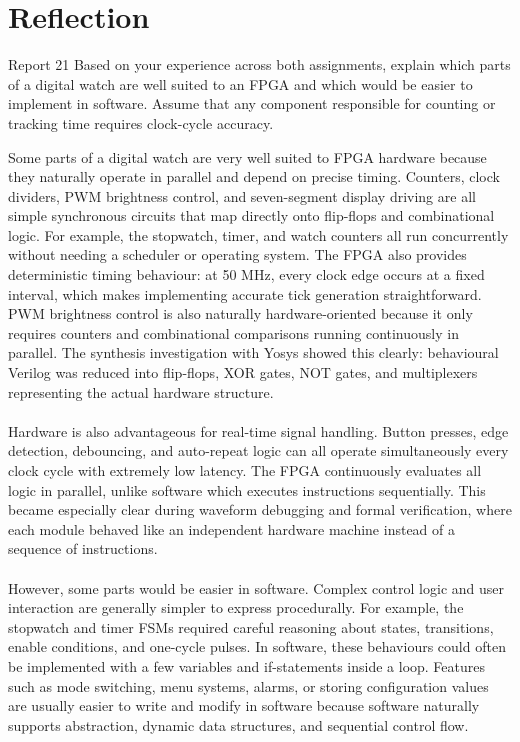 \documentclass[12pt]{article}
\begin{document}
\section{Reflection}
	\begin{reportbox}{Report 21}
		Based on your experience across both assignments, explain which parts of a digital watch are well suited to an FPGA and which would be easier to implement in software. Assume that any component responsible for counting or tracking time requires clock-cycle accuracy.
	\end{reportbox}
	Some parts of a digital watch are very well suited to FPGA hardware because they naturally operate in parallel and depend on precise timing. Counters, clock dividers, PWM brightness control, and seven-segment display driving are all simple synchronous circuits that map directly onto flip-flops and combinational logic. For example, the stopwatch, timer, and watch counters all run concurrently without needing a scheduler or operating system. The FPGA also provides deterministic timing behaviour: at 50 MHz, every clock edge occurs at a fixed interval, which makes implementing accurate tick generation straightforward. PWM brightness control is also naturally hardware-oriented because it only requires counters and combinational comparisons running continuously in parallel. The synthesis investigation with Yosys showed this clearly: behavioural Verilog was reduced into flip-flops, XOR gates, NOT gates, and multiplexers representing the actual hardware structure.\\
	\\
	Hardware is also advantageous for real-time signal handling. Button presses, edge detection, debouncing, and auto-repeat logic can all operate simultaneously every clock cycle with extremely low latency. The FPGA continuously evaluates all logic in parallel, unlike software which executes instructions sequentially. This became especially clear during waveform debugging and formal verification, where each module behaved like an independent hardware machine instead of a sequence of instructions.\\
	\\
	However, some parts would be easier in software. Complex control logic and user interaction are generally simpler to express procedurally. For example, the stopwatch and timer FSMs required careful reasoning about states, transitions, enable conditions, and one-cycle pulses. In software, these behaviours could often be implemented with a few variables and if-statements inside a loop. Features such as mode switching, menu systems, alarms, or storing configuration values are usually easier to write and modify in software because software naturally supports abstraction, dynamic data structures, and sequential control flow.\\
\end{document}
